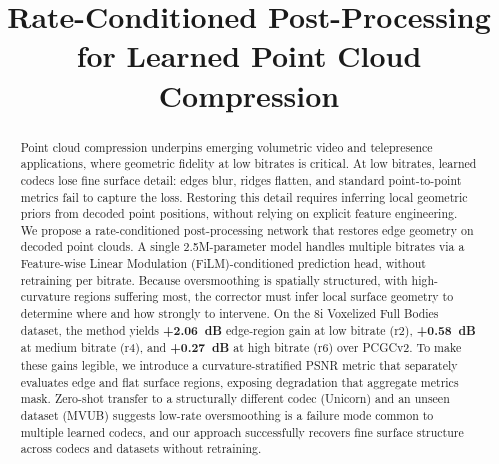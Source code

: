\documentclass[conference]{IEEEtran}
\begin{document}
\title{Rate-Conditioned Post-Processing for Learned Point Cloud Compression}

\author{
  \and
}

\maketitle

\begin{abstract}
Point cloud compression underpins emerging volumetric video and telepresence
applications, where geometric fidelity at low bitrates is critical.
At low bitrates, learned codecs lose fine surface detail: edges blur, ridges
flatten, and standard point-to-point metrics fail to capture the loss.
Restoring this detail requires inferring local geometric priors from decoded
point positions, without relying on explicit feature engineering.
We propose a rate-conditioned post-processing network that restores edge
geometry on decoded point clouds.
A single 2.5M-parameter model handles multiple bitrates via a
Feature-wise Linear Modulation (FiLM)-conditioned prediction head,
without retraining per bitrate.
Because oversmoothing is spatially structured, with high-curvature regions
suffering most, the corrector must infer local surface geometry to determine
where and how strongly to intervene.
On the 8i Voxelized Full Bodies dataset, the method yields \textbf{+2.06~dB}
edge-region gain at low bitrate (r2), \textbf{+0.58~dB} at medium bitrate
(r4), and \textbf{+0.27~dB} at high bitrate (r6) over PCGCv2.
To make these gains legible, we introduce a curvature-stratified PSNR metric
that separately evaluates edge and flat surface regions, exposing degradation
that aggregate metrics mask.
Zero-shot transfer to a structurally different codec (Unicorn) and an unseen
dataset (MVUB) suggests low-rate oversmoothing is a failure mode common to
multiple learned codecs, and our approach successfully recovers fine surface
structure across codecs and datasets without retraining.
\end{abstract}
\end{document}
